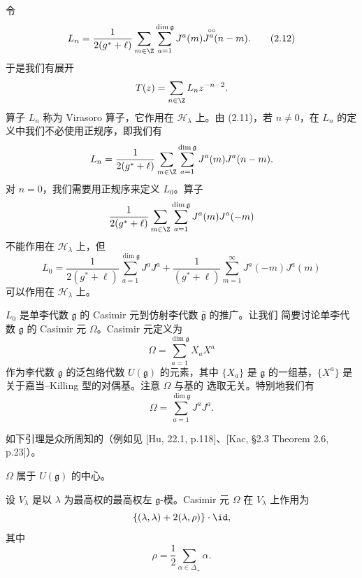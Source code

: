 令
\begin{equation}
L_{n}=\frac{1}{2(g^*+\ell)}\sum_{m\in\Z}\sum_{a=1}^{\dim\mathfrak{g}}
\overset{\circ\circ}{J^{a}(m)J^{a}(n-m)}. \tag{2.12}
\end{equation}
于是我们有展开
\[
T(z)=\sum_{n\in\Z}L_{n}z^{-n-2}.
\]
算子 $L_{n}$ 称为 Virasoro 算子，它作用在 $\mathcal{H}_{\lambda}$ 上。由 (2.11)，若 $n\ne0$，在
$L_{n}$ 的定义中我们不必使用正规序，即我们有
\[
L_{n}=\frac{1}{2(g^*+\ell)}\sum_{m\in\Z}\sum_{a=1}^{\dim\mathfrak{g}}
J^{a}(m)J^{a}(n-m).
\]
对 $n=0$，我们需要用正规序来定义 $L_{0}$。算子
\[
\frac{1}{2(g^*+\ell)}\sum_{m\in\Z}\sum_{a=1}^{\dim\mathfrak{g}}J^{a}(m)J^{a}(-m)
\]
不能作用在 $\mathcal{H}_{\lambda}$ 上，但
\begin{equation}
L_{0}=\frac{1}{2(g^*+\ell)}\sum_{a=1}^{\dim\mathfrak{g}}J^{a}J^{a}
+\frac{1}{(g^*+\ell)}\sum_{m=1}^{\infty}J^{a}(-m)J^{a}(m) \tag{2.13}
\end{equation}
可以作用在 $\mathcal{H}_{\lambda}$ 上。

$L_{0}$ 是单李代数 $\mathfrak{g}$ 的 Casimir 元到仿射李代数 $\hat{\mathfrak{g}}$ 的推广。让我们
简要讨论单李代数 $\mathfrak{g}$ 的 Casimir 元 $\Omega$。Casimir 元定义为
\[
\Omega=\sum_{a=1}^{\dim\mathfrak{g}}X_{a}X^{a}
\]
作为李代数 $\mathfrak{g}$ 的泛包络代数 $U(\mathfrak{g})$ 的元素，其中 $\{X_{a}\}$ 是
$\mathfrak{g}$ 的一组基，$\{X^{a}\}$ 是关于嘉当--Killing 型的对偶基。注意 $\Omega$ 与基的
选取无关。特别地我们有
\[
\Omega=\sum_{a=1}^{\dim\mathfrak{g}}J^{a}J^{a}.
\]

如下引理是众所周知的（例如见 [Hu, 22.1, p.118]、[Kac, \S 2.3 Theorem 2.6, p.23]）。

\begin{lemma}[2.7]
$\Omega$ 属于 $U(\mathfrak{g})$ 的中心。
\end{lemma}


\begin{lemma}[2.8]
设 $V_{\lambda}$ 是以 $\lambda$ 为最高权的最高权左 $\mathfrak{g}$-模。Casimir 元 $\Omega$ 在
$V_{\lambda}$ 上作用为
\[
\{(\lambda,\lambda)+2(\lambda,\rho)\}\cdot\id,
\]
其中
\begin{equation}
\rho=\frac{1}{2}\sum_{\alpha\in\Delta_+}\alpha. \tag{2.14}
\end{equation}
\end{lemma}

